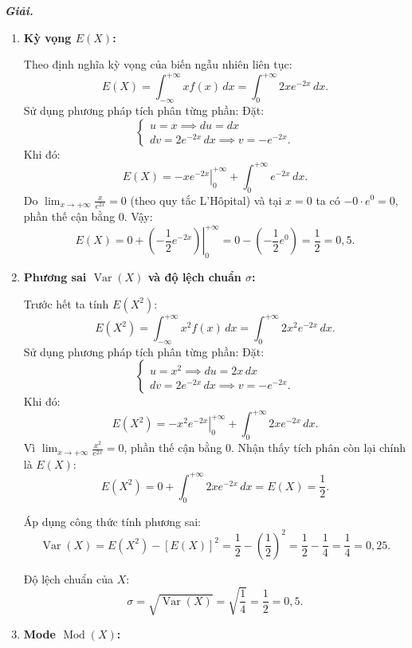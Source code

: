 \documentclass[12pt,a4paper]{article}
\theoremstyle{definition}
\newcommand{\giai}{\noindent\textbf{\textit{Giải.}}\ }
\begin{document}
\giai
\begin{enumerate}[label=\arabic*)]
    \item \textbf{Kỳ vọng $E(X)$:}

    Theo định nghĩa kỳ vọng của biến ngẫu nhiên liên tục:
    \[
    E(X) = \int_{-\infty}^{+\infty} x f(x)\,dx = \int_0^{+\infty} 2x e^{-2x}\,dx.
    \]
    Sử dụng phương pháp tích phân từng phần:
    Đặt:
    \[
    \begin{cases}
    u = x \implies du = dx \\
    dv = 2e^{-2x}\,dx \implies v = -e^{-2x}.
    \end{cases}
    \]
    Khi đó:
    \[
    E(X) = \left. -x e^{-2x} \right|_0^{+\infty} + \int_0^{+\infty} e^{-2x}\,dx.
    \]
    Do $\displaystyle\lim_{x \to +\infty} \frac{x}{e^{2x}} = 0$ (theo quy tắc L'Hôpital) và tại $x = 0$ ta có $-0 \cdot e^0 = 0$, phần thế cận bằng 0. Vậy:
    \[
    E(X) = 0 + \left. \left(-\frac{1}{2} e^{-2x}\right) \right|_0^{+\infty} = 0 - \left(-\frac{1}{2} e^0\right) = \frac{1}{2} = 0{,}5.
    \]

    \item \textbf{Phương sai $\operatorname{Var}(X)$ và độ lệch chuẩn $\sigma$:}

    Trước hết ta tính $E(X^2)$:
    \[
    E(X^2) = \int_{-\infty}^{+\infty} x^2 f(x)\,dx = \int_0^{+\infty} 2x^2 e^{-2x}\,dx.
    \]
    Sử dụng phương pháp tích phân từng phần:
    Đặt:
    \[
    \begin{cases}
    u = x^2 \implies du = 2x\,dx \\
    dv = 2e^{-2x}\,dx \implies v = -e^{-2x}.
    \end{cases}
    \]
    Khi đó:
    \[
    E(X^2) = \left. -x^2 e^{-2x} \right|_0^{+\infty} + \int_0^{+\infty} 2x e^{-2x}\,dx.
    \]
    Vì $\displaystyle\lim_{x \to +\infty} \frac{x^2}{e^{2x}} = 0$, phần thế cận bằng 0. Nhận thấy tích phân còn lại chính là $E(X)$:
    \[
    E(X^2) = 0 + \int_0^{+\infty} 2x e^{-2x}\,dx = E(X) = \frac{1}{2}.
    \]

    Áp dụng công thức tính phương sai:
    \[
    \operatorname{Var}(X) = E(X^2) - [E(X)]^2 = \frac{1}{2} - \left(\frac{1}{2}\right)^2 = \frac{1}{2} - \frac{1}{4} = \frac{1}{4} = 0{,}25.
    \]

    Độ lệch chuẩn của $X$:
    \[
    \sigma = \sqrt{\operatorname{Var}(X)} = \sqrt{\frac{1}{4}} = \frac{1}{2} = 0{,}5.
    \]

    \item \textbf{Mode $\operatorname{Mod}(X)$:}


\end{enumerate}
\end{document}
